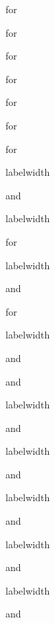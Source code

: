 \begin{multicols}{2}
	\begin{homeworks}
		\item for
		\item for
		\item for
		\item for
		\item for
		\item for
		\item for
		\item labelwidth
		\item and
		\item labelwidth
		\item for
		\item labelwidth
		\item and
		\item for
		\item labelwidth
		\item and
		\item and
		\item labelwidth
		\item and
		\item labelwidth
		\item and
		\item labelwidth
		\item and
		\item labelwidth
		\item and
		\item labelwidth
		\item and
	\end{homeworks}
\end{multicols}
